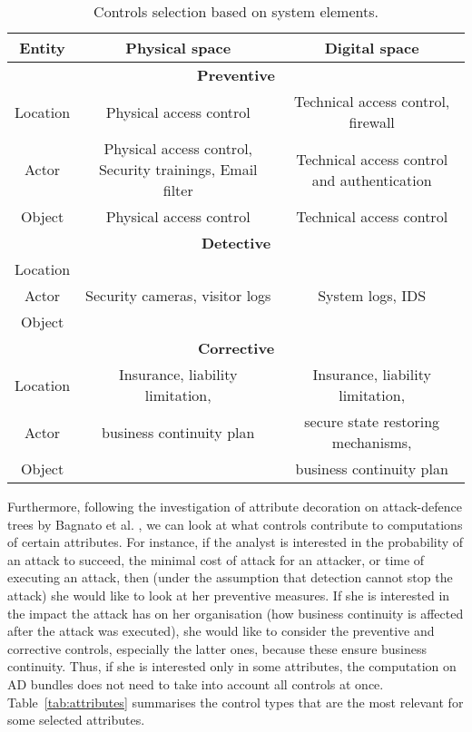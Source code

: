 \documentclass{llncs}
\begin{document}
\begin{table}[t!]
\centering
\caption{Controls selection based on system elements. }
\label{tab:preventive}
\scriptsize
\begin{tabular}{|c|c|c|}
\hline
\textbf{Entity}  &  \textbf{Physical space}  & \textbf{Digital space}   \\
\hline
\hline
\multicolumn{3}{|c|}{\textbf{Preventive}}\\
\hline
Location & Physical access control  & Technical access control, firewall  \\
\hline
Actor & Physical access control, Security trainings, Email filter  & Technical access control and authentication\\
\hline
Object & Physical access control  & Technical access control \\
\hline
\multicolumn{3}{|c|}{\textbf{Detective}}\\
\hline
Location & \multirow{3}{*}{ Security cameras, visitor logs}  & \multirow{3}{*}{System logs, IDS} \\
Actor & &\\
Object & & \\

\hline
\multicolumn{3}{|c|}{\textbf{Corrective}}\\
\hline
Location & 
Insurance, liability limitation,   & Insurance, liability limitation, \\
Actor &  business continuity plan & secure state restoring mechanisms, \\
Object &   & business continuity plan \\
\hline

\end{tabular}
\end{table}

Furthermore, following the investigation of attribute decoration on attack-defence trees by Bagnato et al. \cite{Bagnato-IJSSE-2012}, we can look at what controls contribute to computations of certain attributes. For instance, if the analyst is interested in the probability of an attack to succeed, the minimal cost of attack for an attacker, or time of executing an attack, then (under the assumption that detection cannot stop the attack) she would like to look at her preventive measures. If she is interested in the impact the attack has on her organisation (how business continuity is affected after the attack was executed), she would like to consider the preventive and corrective controls, especially the latter ones, because these ensure business continuity. Thus, if she is interested only in some attributes, the computation on AD bundles does not need to take into account all controls at once. Table~\ref{tab:attributes} summarises the control types that are the most relevant for some selected attributes. 
\end{document}
